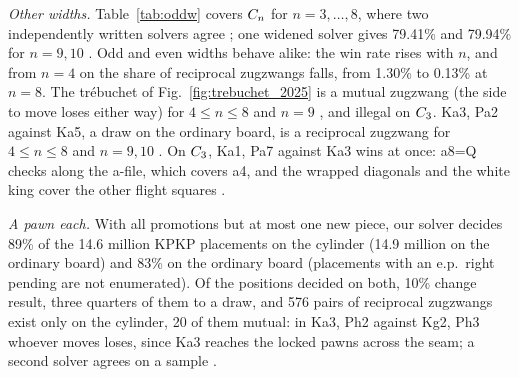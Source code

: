 \emph{Other widths.} Table~\ref{tab:oddw} covers $C_{n}$ for $n=3,\dots,8$, where two independently
written solvers agree ; one widened solver gives 79.41\% and 79.94\% for $n=9,10$ . Odd
and even widths behave alike: the win rate rises with $n$, and from $n=4$ on the share of reciprocal zugzwangs falls,
from 1.30\% to 0.13\% at $n=8$. The tr\'ebuchet of Fig.~\ref{fig:trebuchet_2025} is a mutual zugzwang (the side to
move loses either way) for $4\le n\le8$  and $n=9$ , and illegal on $C_{3}$. Ka3, Pa2 against
Ka5, a draw on the ordinary board, is a reciprocal zugzwang for $4\le n\le8$  and $n=9,10$ . On $C_{3}$, Ka1, Pa7 against Ka3
wins at once: a8=Q checks along the a-file, which covers a4, and the wrapped diagonals and the white king cover
the other flight squares .

\emph{A pawn each.} With all promotions but at most one new piece, our solver decides 89\% of the 14.6 million
KPKP placements on the cylinder (14.9 million on the ordinary board) and 83\% on the ordinary board 
(placements with an e.p.\ right pending are not enumerated). Of the positions decided on both,
10\% change result, three quarters of them to a draw, and 576 pairs of reciprocal zugzwangs exist only on the
cylinder, 20 of them mutual: in Ka3, Ph2 against Kg2, Ph3 whoever moves loses, since Ka3 reaches the
locked pawns across the seam; a second solver agrees on a sample .
